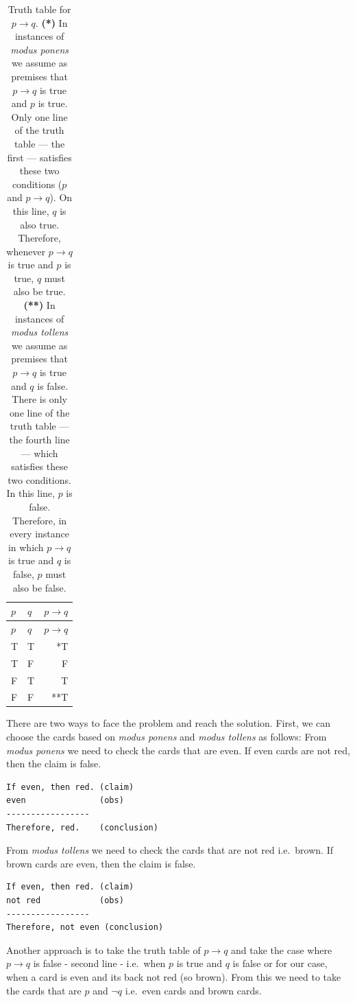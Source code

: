 \documentclass[
]{book}
\begin{document}
\begin{longtable}[]{@{}llr@{}}
\caption{Truth table for \(p \rightarrow q\). \textbf{(*)} In instances of \emph{modus ponens} we assume as premises that \(p \rightarrow q\) is true and \(p\) is true. Only one line of the truth table --- the first --- satisfies these two conditions (\(p\) and \(p \rightarrow q\)). On this line, \(q\) is also true. Therefore, whenever \(p \rightarrow q\) is true and \(p\) is true, \(q\) must also be true. \textbf{(**)} In instances of \emph{modus tollens} we assume as premises that \(p \rightarrow q\) is true and \(q\) is false. There is only one line of the truth table --- the fourth line --- which satisfies these two conditions. In this line, \(p\) is false. Therefore, in every instance in which \(p \rightarrow q\) is true and \(q\) is false, \(p\) must also be false.}\tabularnewline
\toprule()
\(p\) & \(q\) & \(p \rightarrow q\) \\
\midrule()
\endfirsthead
\toprule()
\(p\) & \(q\) & \(p \rightarrow q\) \\
\midrule()
\endhead
T & T & *T \\
T & F & F \\
F & T & T \\
F & F & **T \\
\bottomrule()
\end{longtable}





There are two ways to face the problem and reach the solution. First, we can choose the cards based on \emph{modus ponens} and \emph{modus tollens} as follows: From \emph{modus ponens} we need to check the cards that are even. If even cards are not red, then the claim is false.

\begin{verbatim}
If even, then red. (claim)
even               (obs)
-----------------
Therefore, red.    (conclusion)
\end{verbatim}

From \emph{modus tollens} we need to check the cards that are not red i.e.~brown. If brown cards are even, then the claim is false.

\begin{verbatim}
If even, then red. (claim)
not red            (obs)
-----------------
Therefore, not even (conclusion)
\end{verbatim}

Another approach is to take the truth table of \(p \rightarrow q\) and take the case where \(p \rightarrow q\) is false - second line - i.e.~when \(p\) is true and \(q\) is false or for our case, when a card is even and its back not red (so brown). From this we need to take the cards that are \(p\) and \(\lnot q\) i.e.~even cards and brown cards.
\end{document}
